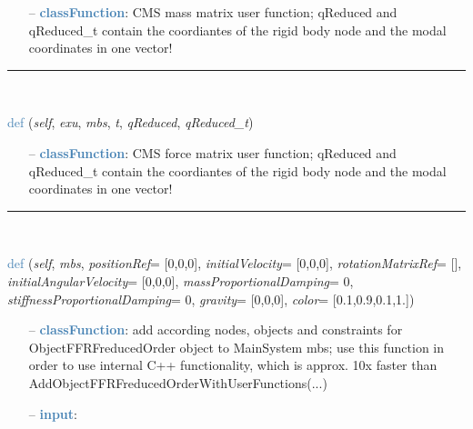 \begin{itemize}[leftmargin=1.4cm]
\begin{itemize}[leftmargin=1.4cm]
\begin{itemize}[leftmargin=0.5cm]
\begin{itemize}[leftmargin=1.4cm]
\begin{itemize}[leftmargin=1.4cm]
\begin{itemize}[leftmargin=0.5cm]
\setlength{\itemindent}{0.7cm}
\begin{itemize}[leftmargin=0.7cm]
  \item[--]  \textcolor{steelblue}{\bf classFunction}: CMS mass matrix user function; qReduced and qReduced\_t contain the coordiantes of the rigid body node and the modal coordinates in one vector!\vspace{12pt}\end{itemize}
%
\noindent\rule{8cm}{0.75pt}\vspace{1pt} \\ 
\begin{flushleft}
\noindent \textcolor{steelblue}{def {\bf {}}}\label{sec:FEM:ObjectFFRFreducedOrderInterface:UFforceFFRFreducedOrder}
({\it self}, {\it exu}, {\it mbs}, {\it t}, {\it qReduced}, {\it qReduced\_t})
\end{flushleft}
\setlength{\itemindent}{0.7cm}
\begin{itemize}[leftmargin=0.7cm]
  \item[--]  \textcolor{steelblue}{\bf classFunction}: CMS force matrix user function; qReduced and qReduced\_t contain the coordiantes of the rigid body node and the modal coordinates in one vector!\vspace{12pt}\end{itemize}
%
\noindent\rule{8cm}{0.75pt}\vspace{1pt} \\ 
\begin{flushleft}
\noindent \textcolor{steelblue}{def {\bf {}}}\label{sec:FEM:ObjectFFRFreducedOrderInterface:AddObjectFFRFreducedOrder}
({\it self}, {\it mbs}, {\it positionRef}= [0,0,0], {\it initialVelocity}= [0,0,0], {\it rotationMatrixRef}= [], {\it initialAngularVelocity}= [0,0,0], {\it massProportionalDamping}= 0, {\it stiffnessProportionalDamping}= 0, {\it gravity}= [0,0,0], {\it color}= [0.1,0.9,0.1,1.])
\end{flushleft}
\setlength{\itemindent}{0.7cm}
\begin{itemize}[leftmargin=0.7cm]
  \item[--]  \textcolor{steelblue}{\bf classFunction}: add according nodes, objects and constraints for ObjectFFRFreducedOrder object to MainSystem mbs; use this function in order to use internal C++ functionality, which is approx. 10x faster than AddObjectFFRFreducedOrderWithUserFunctions(...)  \item[--]  \textcolor{steelblue}{\bf input}: \vspace{-6pt}

\end{itemize}
\end{itemize}
\end{itemize}
\end{itemize}
\end{itemize}
\end{itemize}
\end{itemize}
